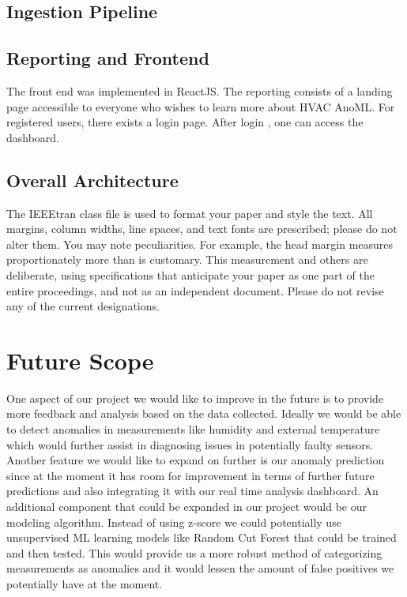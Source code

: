 \documentclass[conference]{IEEEtran}
\begin{document}
\subsection{Ingestion Pipeline}


\subsection{Reporting and Frontend}

The front end was implemented in ReactJS. The reporting consists of a landing page accessible to everyone who wishes to learn more about HVAC AnoML. For registered users, there exists a login page. After login , one can access the dashboard. 

\subsection{Overall Architecture}

The IEEEtran class file is used to format your paper and style the text. All margins, 
column widths, line spaces, and text fonts are prescribed; please do not 
alter them. You may note peculiarities. For example, the head margin
measures proportionately more than is customary. This measurement 
and others are deliberate, using specifications that anticipate your paper 
as one part of the entire proceedings, and not as an independent document. 
Please do not revise any of the current designations.

\section*{Future Scope}
One aspect of our project we would like to improve in the future is to provide more feedback and analysis based on the data collected. Ideally we would be able to detect anomalies in measurements like humidity and external temperature which would further assist in diagnosing issues in potentially faulty sensors. Another feature we would like to expand on further is our anomaly prediction since at the moment it has room for improvement in terms of further future predictions and also integrating it with our real time analysis dashboard. An additional component that could be expanded in our project would be our modeling algorithm. Instead of using z-score we could potentially use unsupervised ML learning models like Random Cut Forest that could be trained and then tested. This would provide us a more robust method of categorizing measurements as anomalies and it would lessen the amount of false positives we potentially have at the moment.
\end{document}
